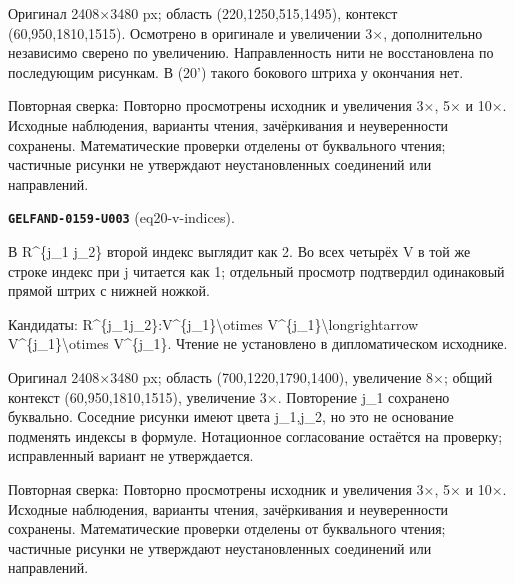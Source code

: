Оригинал 2408×3480 px; область (220,1250,515,1495), контекст (60,950,1810,1515). Осмотрено в оригинале и увеличении 3×, дополнительно независимо сверено по увеличению. Направленность нити не восстановлена по последующим рисункам. В (20') такого бокового штриха у окончания нет.\par
Повторная сверка: Повторно просмотрены исходник и увеличения 3×, 5× и 10×. Исходные наблюдения, варианты чтения, зачёркивания и неуверенности сохранены. Математические проверки отделены от буквального чтения; частичные рисунки не утверждают неустановленных соединений или направлений.\par\medskip
\par\noindent\leavevmode{}\label{GELFAND-0159-U003}\label{GELFAND-P001465:eq20-v-indices}\textbf{\texttt{GELFAND-0159-U003}} (eq20-v-indices).\nopagebreak[4]\par
В R\textasciicircum{}\{j\_1 j\_2\} второй индекс выглядит как 2. Во всех четырёх V в той же строке индекс при j читается как 1; отдельный просмотр подтвердил одинаковый прямой штрих с нижней ножкой.\par
Кандидаты: R\textasciicircum{}\{j\_1j\_2\}:V\textasciicircum{}\{j\_1\}\textbackslash{}otimes V\textasciicircum{}\{j\_1\}\textbackslash{}longrightarrow V\textasciicircum{}\{j\_1\}\textbackslash{}otimes V\textasciicircum{}\{j\_1\}. Чтение не установлено в дипломатическом исходнике.\par
Оригинал 2408×3480 px; область (700,1220,1790,1400), увеличение 8×; общий контекст (60,950,1810,1515), увеличение 3×. Повторение j\_1 сохранено буквально. Соседние рисунки имеют цвета j\_1,j\_2, но это не основание подменять индексы в формуле. Нотационное согласование остаётся на проверку; исправленный вариант не утверждается.\par
Повторная сверка: Повторно просмотрены исходник и увеличения 3×, 5× и 10×. Исходные наблюдения, варианты чтения, зачёркивания и неуверенности сохранены. Математические проверки отделены от буквального чтения; частичные рисунки не утверждают неустановленных соединений или направлений.\par\medskip
